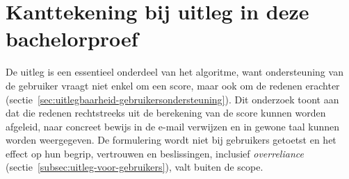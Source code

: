 \section{Kanttekening bij uitleg in deze bachelorproef}%
\label{sec:kanttekening-uitleg}

De uitleg is een essentieel onderdeel van het algoritme, want ondersteuning van de gebruiker vraagt niet enkel om een score, maar ook om de redenen erachter (sectie~\ref{sec:uitlegbaarheid-gebruikersondersteuning}). Dit onderzoek toont aan dat die redenen rechtstreeks uit de berekening van de score kunnen worden afgeleid, naar concreet bewijs in de e-mail verwijzen en in gewone taal kunnen worden weergegeven. De formulering wordt niet bij gebruikers getoetst en het effect op hun begrip, vertrouwen en beslissingen, inclusief \emph{overreliance} (sectie~\ref{subsec:uitleg-voor-gebruikers}), valt buiten de scope.